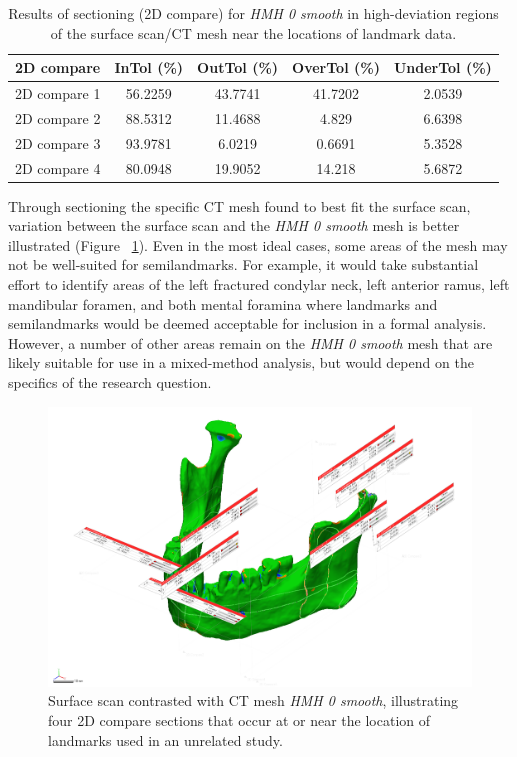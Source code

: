 \documentclass[review]{elsarticle}
\begin{document}
\begin{table}[tbh]\centering
\footnotesize
\caption{Results of sectioning (2D compare) for \textit{HMH 0 smooth} in high-deviation regions of the surface scan/CT mesh near the locations of landmark data.}
\centering
\begin{tabular}{lcccc}
\hline
2D compare & InTol (\%) & OutTol (\%) & OverTol (\%) & UnderTol (\%)\\
\hline
2D compare 1 & 56.2259 & 43.7741 & 41.7202 & 2.0539\\
2D compare 2 & 88.5312 & 11.4688 & 4.829 & 6.6398\\
2D compare 3 & 93.9781 & 6.0219 & 0.6691 & 5.3528\\
2D compare 4 & 80.0948 & 19.9052 & 14.218 & 5.6872\\
\hline
\end{tabular}
\label{tab:Tbl3}
\end{table}

Through sectioning the specific CT mesh found to best fit the surface scan, variation between the surface scan and the \textit{HMH 0 smooth} mesh is better illustrated (Figure ~\ref{fig:Fig6}). Even in the most ideal cases, some areas of the mesh may not be well-suited for semilandmarks. For example, it would take substantial effort to identify areas of the left fractured condylar neck, left anterior ramus, left mandibular foramen, and both mental foramina where landmarks and semilandmarks would be deemed acceptable for inclusion in a formal analysis. However, a number of other areas remain on the \textit{HMH 0 smooth} mesh that are likely suitable for use in a mixed-method analysis, but would depend on the specifics of the research question.

\begin{figure}[ht]\centering
\includegraphics[width=\linewidth]{Fig6}
\caption{Surface scan contrasted with CT mesh \textit{HMH 0 smooth}, illustrating four 2D compare sections that occur at or near the location of landmarks used in an unrelated study.}
\label{fig:Fig6}
\end{figure}
\end{document}
